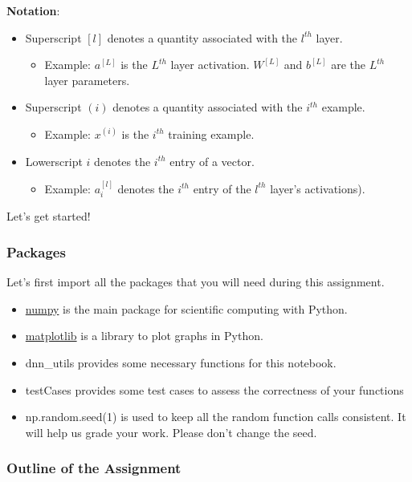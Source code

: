 {\textbf {Notation}}:
\begin{itemize}
\item Superscript $[l]$ denotes a quantity associated with the $l^{th}$ layer. 
\begin{itemize}
\item Example: $a^{[L]}$ is the $L^{th}$ layer activation. $W^{[L]}$ and $b^{[L]}$ are the $L^{th}$ layer parameters.
\end{itemize}
\item Superscript $(i)$ denotes a quantity associated with the $i^{th}$ example. 
\begin{itemize}
\item Example: $x^{(i)}$ is the $i^{th}$ training example.
\end{itemize}
\item Lowerscript $i$ denotes the $i^{th}$ entry of a vector.
\begin{itemize}
\item Example: $a^{[l]}_i$ denotes the $i^{th}$ entry of the $l^{th}$ layer's activations).
\end{itemize}
\end{itemize}

Let's get started!


\subsubsection{Packages}

Let's first import all the packages that you will need during this assignment. 
\begin{itemize}
\item \href{www.numpy.org}{numpy} is the main package for scientific computing with Python.
\item \href{http://matplotlib.org}{matplotlib} is a library to plot graphs in Python.
\item dnn\_utils provides some necessary functions for this notebook.
\item testCases provides some test cases to assess the correctness of your functions
\item np.random.seed(1) is used to keep all the random function calls consistent. It will help us grade your work. Please don't change the seed. 
\end{itemize}

\subsubsection{Outline of the Assignment}

